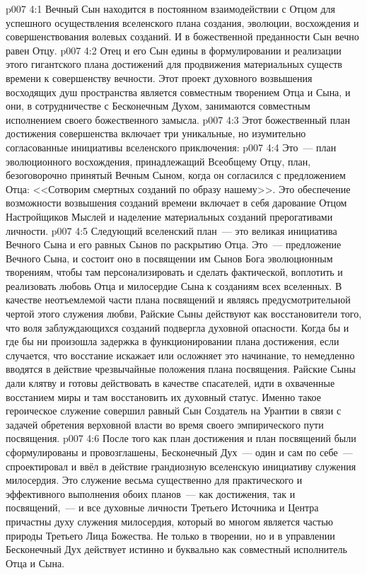 \vs p007 4:1 Вечный Сын находится в постоянном взаимодействии с Отцом для успешного осуществления  вселенского плана создания, эволюции, восхождения и совершенствования волевых созданий. И в божественной преданности Сын вечно равен Отцу.
\vs p007 4:2 Отец и его Сын едины в формулировании и реализации этого гигантского плана достижений для продвижения материальных существ времени к совершенству вечности. Этот проект духовного возвышения восходящих душ пространства является совместным творением Отца и Сына, и они, в сотрудничестве с Бесконечным Духом, занимаются совместным исполнением своего божественного замысла.
\vs p007 4:3 \pc Этот божественный план достижения совершенства включает три уникальные, но изумительно согласованные инициативы вселенского приключения:
\vs p007 4:4  Это~--- план эволюционного восхождения, принадлежащий Всеобщему Отцу, план, безоговорочно принятый Вечным Сыном, когда он согласился с предложением Отца: <<Сотворим смертных созданий по образу нашему>>. Это обеспечение возможности возвышения созданий времени включает в себя дарование Отцом Настройщиков Мыслей и наделение материальных созданий прерогативами личности.
\vs p007 4:5  Следующий вселенский план~--- это великая инициатива Вечного Сына и его равных Сынов по раскрытию Отца. Это~--- предложение Вечного Сына, и состоит оно в посвящении им Сынов Бога эволюционным творениям, чтобы там персонализировать и сделать фактической, воплотить и реализовать любовь Отца и милосердие Сына к созданиям всех вселенных. В качестве неотъемлемой части плана посвящений и являясь предусмотрительной чертой этого служения любви, Райские Сыны действуют как восстановители того, что воля заблуждающихся созданий подвергла духовной опасности. Когда бы и где бы ни произошла задержка в функционировании плана достижения, если случается, что восстание искажает или осложняет это начинание, то немедленно вводятся в действие чрезвычайные положения плана посвящения. Райские Сыны дали клятву и готовы действовать в качестве спасателей, идти в охваченные восстанием миры и там восстановить их духовный статус. Именно такое героическое служение совершил равный Сын Создатель на Урантии в связи с задачей обретения верховной власти во время своего эмпирического пути посвящения.
\vs p007 4:6  После того как план достижения и план посвящений были сформулированы и провозглашены, Бесконечный Дух~--- один и сам по себе~--- спроектировал и ввёл в действие грандиозную вселенскую инициативу служения милосердия. Это служение весьма существенно для практического и эффективного выполнения обоих планов~--- как достижения, так и посвящений,~--- и все духовные личности Третьего Источника и Центра причастны духу служения милосердия, который во многом является частью природы Третьего Лица Божества. Не только в творении, но и в управлении Бесконечный Дух действует истинно и буквально как совместный исполнитель Отца и Сына.
